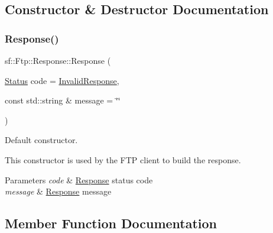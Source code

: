 \subsection{Constructor \& Destructor Documentation}
\mbox{\label{classsf_1_1_ftp_1_1_response_af300fffd4862774102f978eb22f85d9b}} 
\subsubsection{\texorpdfstring{Response()}{Response()}}
{\footnotesize\ttfamily sf\+::\+Ftp\+::\+Response\+::\+Response (\begin{DoxyParamCaption}\item[{\hyperlink{classsf_1_1_ftp_1_1_response_af81738f06b6f571761696291276acb3b}{Status}}]{code = {\ttfamily \hyperlink{classsf_1_1_ftp_1_1_response_af81738f06b6f571761696291276acb3ba59e041e4ef186e8ae8d6035973fc46bd}{Invalid\+Response}},  }\item[{const std\+::string \&}]{message = {\ttfamily \char`\"{}\char`\"{}} }\end{DoxyParamCaption})\hspace{0.3cm}{\ttfamily [explicit]}}



Default constructor. 

This constructor is used by the F\+TP client to build the response.


\begin{DoxyParams}{Parameters}
{\em code} & \hyperlink{classsf_1_1_ftp_1_1_response}{Response} status code \\
\hline
{\em message} & \hyperlink{classsf_1_1_ftp_1_1_response}{Response} message \\
\hline
\end{DoxyParams}


\subsection{Member Function Documentation}
\mbox{\label{classsf_1_1_ftp_1_1_response_a4af82a0b3620c90558390e1f600abc05}} 
